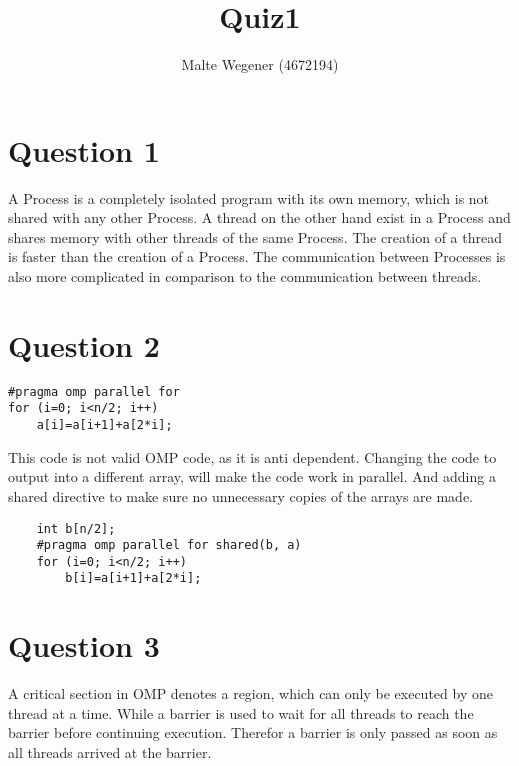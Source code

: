 \documentclass{article}
\begin{document}
\title{Quiz1}
\author{Malte Wegener (4672194)}

\maketitle

\section{Question 1}
A Process is a completely isolated program with its own memory, which is not shared with any other Process. A thread on the other hand exist in a Process and shares memory with other threads of the same Process. The creation of a thread is faster than the creation of a Process. The communication between Processes is also more complicated in comparison to the communication between threads.

\section{Question 2}
\begin{lstlisting}
#pragma omp parallel for
for (i=0; i<n/2; i++)
    a[i]=a[i+1]+a[2*i];
\end{lstlisting}
This code is not valid OMP code, as it is anti dependent. Changing the code to output into a different array, will make the code work in parallel. And adding a shared directive to make sure no unnecessary copies of the arrays are made.
\begin{lstlisting}
    int b[n/2];
    #pragma omp parallel for shared(b, a)
    for (i=0; i<n/2; i++)
        b[i]=a[i+1]+a[2*i];
    \end{lstlisting}

\section{Question 3}
A critical section in OMP denotes a region, which can only be executed by one thread at a time. While a barrier is used to wait for all threads to reach the barrier before continuing execution. Therefor a barrier is only passed as soon as all threads arrived at the barrier.
\end{document}
